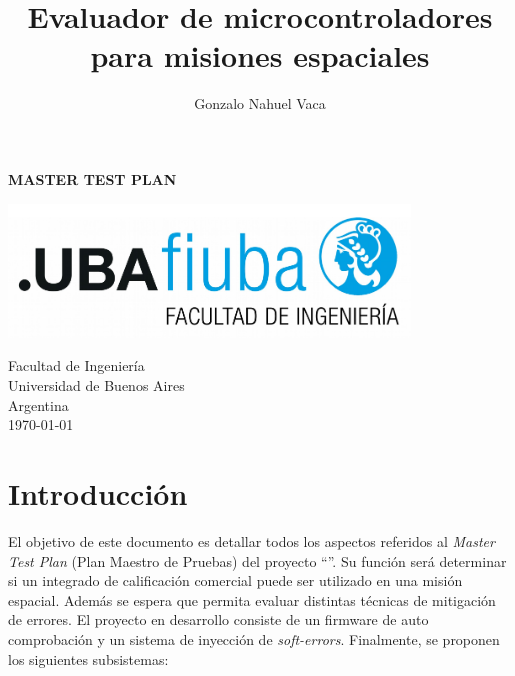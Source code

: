 \documentclass[
	14pt,
	a4paper
]{article}
\title{Evaluador de microcontroladores para misiones espaciales}
\author{Gonzalo Nahuel Vaca}
\def\doctype{MASTER TEST PLAN}
\begin{document}
\makeatletter
\begin{titlepage}
	\begin{center}
		\vspace*{1cm}
		
		\Huge
		\textbf{\doctype}
		
		\vspace{0.5cm}
		\LARGE
		\@title
		
		\vspace{1.5cm}
		
		\textbf{\@author}

		\vspace{3.5cm}

		\includegraphics[width=0.8\textwidth]{img/logoFIUBA.pdf}
		
		\vfill
		Facultad de Ingeniería\\
		Universidad de Buenos Aires\\
		Argentina\\
		\today
	\end{center}
\end{titlepage}
\makeatother
\newpage

\section{Introducción}
\label{sec:introduccion}

El objetivo de este documento es detallar todos los aspectos referidos al \emph{Master Test Plan} (Plan Maestro de Pruebas) del proyecto ``\MyTitle ''.
Su función será determinar si un integrado de calificación comercial puede ser utilizado en una misión espacial. Además se espera que permita evaluar distintas técnicas de mitigación de errores.
El proyecto en desarrollo consiste de un firmware de auto comprobación y un sistema de inyección de \emph{soft-errors}.
Finalmente, se proponen los siguientes subsistemas:
\end{document}
